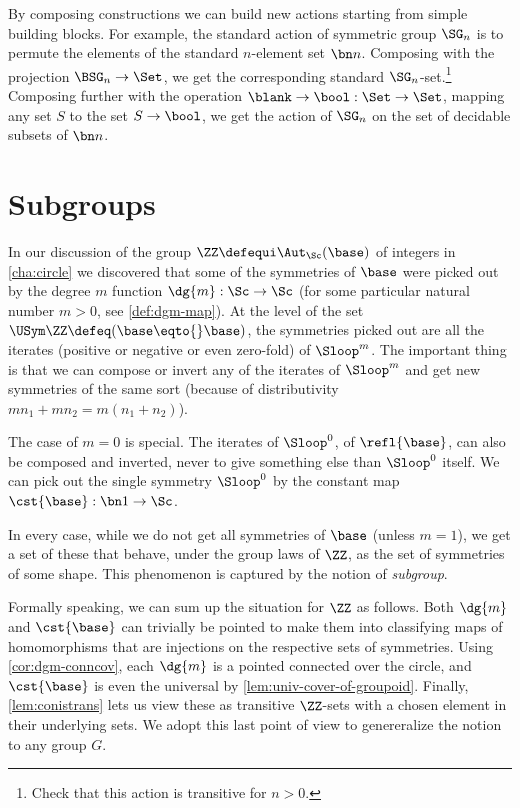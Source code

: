 \begin{example}
  By composing constructions we can build new actions
  starting from simple building blocks.
  For example, the standard action of symmetric group $\SG_n$
  is to permute the elements of the standard $n$-element set $\bn n$.
  Composing with the projection $\BSG_n \to \Set$,
  we get the corresponding standard $\SG_n$-set.\footnote{%
    Check that this action is transitive for $n>0$.}
  Composing further with the operation $\blank \to \bool : \Set \to \Set$,
  mapping any set $S$ to the set $S\to\bool$,
  we get the action of $\SG_n$ on the set of decidable subsets of $\bn n$.
\end{example}

\section{Subgroups}
\label{sec:subgroups}
In our discussion of the group $\ZZ\defequi\Aut_{\Sc}(\base)$ of integers in
\cref{cha:circle} we discovered that some of the symmetries of $\base$ were
picked out by the degree $m$ function $\dg{m}: \Sc\to\Sc$ (for some particular
natural number $m>0$, see \cref{def:dgm-map}).  At the level of the set
$\USym \ZZ \defeq (\base\eqto{}\base)$, the symmetries picked out are all the
iterates (positive or negative or even zero-fold) of $\Sloop^m$.  The important
thing is that we can compose or invert any of the iterates of $\Sloop^m$ and get
new symmetries of the same sort (because of distributivity
$mn_1+mn_2=m(n_1+n_2)$).%

The case of $m=0$ is special. The iterates of $\Sloop^0$, \ie of
$\refl{\base}$, can also be composed and inverted, never to give
something else than $\Sloop^0$ itself. %
We can pick out the single symmetry $\Sloop^0$
by the constant map $\cst{\base} : \bn 1 \to \Sc$.

In every case, while we do not get all symmetries of $\base$ (unless $m=1$), we
get a set of these that behave, under the group laws of $\ZZ$, as the set of
symmetries of some shape. This phenomenon is captured by the notion of {\em
  subgroup}.

Formally speaking, we can sum up the situation for $\ZZ$ as follows. Both
$\dg{m}$ and $\cst{\base}$ can trivially be pointed to make them into
classifying maps of homomorphisms that are injections on the respective sets of
symmetries. Using \cref{cor:dgm-conncov}, each $\dg{m}$ is a pointed connected
\covering over the circle, and $\cst{\base}$ is even the universal \covering by
\cref{lem:univ-cover-of-groupoid}. Finally, \cref{lem:conistrans} lets us view
these as transitive $\ZZ$-sets with a chosen element in their underlying
sets. We adopt this last point of view to genereralize the notion to any group
$G$.

